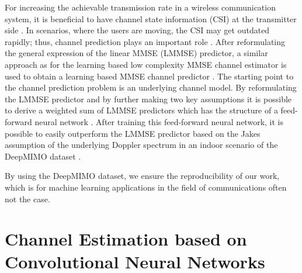 \documentclass[12pt, draftclsnofoot, onecolumn]{IEEEtran}
\begin{document}
For increasing the achievable transmission rate in a wireless communication system, it is beneficial to have channel state information (CSI) at the transmitter side \cite{Zemen}. In scenarios, where the users are moving, the CSI may get outdated rapidly; thus, channel prediction plays an important role \cite{Zemen}. After reformulating the general expression of the linear MMSE (LMMSE) predictor, a similar approach as for the learning based low complexity MMSE channel estimator \cite{Neumann} is used to obtain a learning based MMSE channel predictor \cite{turan2019learning}. The starting point to the channel prediction problem is an underlying channel model. By reformulating the LMMSE predictor and by further making two key assumptions it is possible to derive a weighted sum of LMMSE predictors which has the structure of a feed-forward neural network \cite{turan2019learning}. After training this feed-forward neural network, it is possible to easily outperform the LMMSE predictor based on the Jakes assumption of the underlying Doppler spectrum in an indoor scenario of the DeepMIMO dataset \cite{turan2019learning}.

By using the DeepMIMO dataset, we ensure the reproducibility of our work, which is for machine learning applications in the field of communications often not the case. 
\section{Channel Estimation based on Convolutional Neural Networks}
\end{document}
